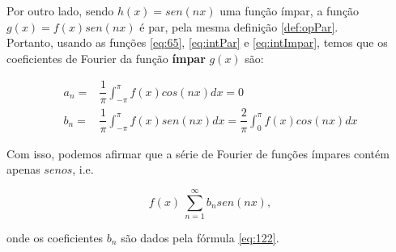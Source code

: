     Por outro lado, sendo $h(x) = sen(nx)$ uma função ímpar, a função $g(x) = f(x)sen(nx)$ é par, pela mesma 
    definição \ref{def:opPar}.\\
    
    Portanto, usando as funções \ref{eq:65}, \ref{eq:intPar} e \ref{eq:intImpar}, temos 
    que os coeficientes de Fourier da função \textbf{ímpar} $g(x)$ são:

    \begin{equation}
    \label{eq:122}
        \begin{split}
            a_n = &\dfrac{1}{\pi}\int_{-\pi}^{\pi}f(x)cos(nx) dx = 0 \\
            b_n = &\dfrac{1}{\pi}\int_{-\pi}^{\pi}f(x)sen(nx) dx = \dfrac{2}{\pi}\int_{0}^{\pi} f(x)cos(nx) dx 
        \end{split}
    \end{equation}

    Com isso, podemos afirmar que a série de Fourier de funções ímpares contém apenas $senos$, i.e.

    \begin{equation}
        f(x) ~ \sum\limits_{n=1}^{\infty}b_n sen(nx),
    \end{equation}

    onde os coeficientes $b_n$ são dados pela fórmula \ref{eq:122}.